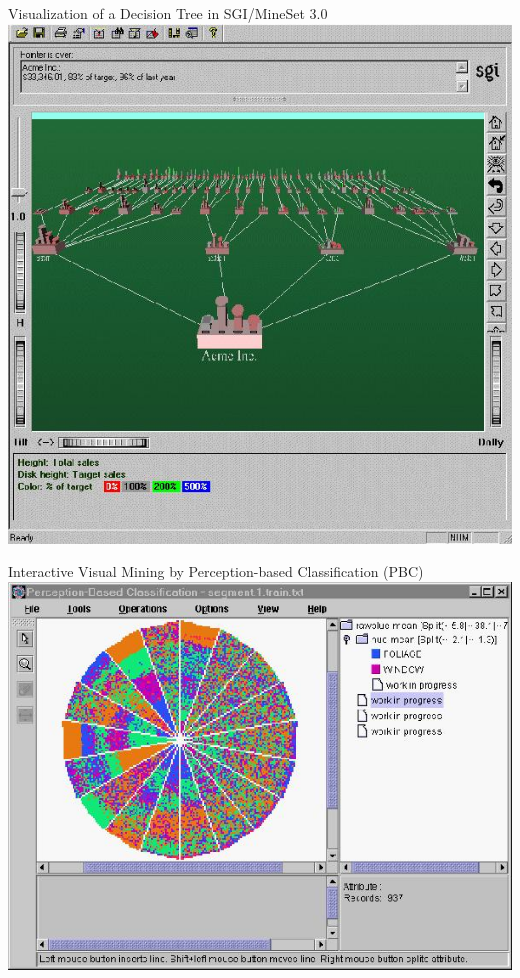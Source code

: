 \begin{frame}{Visualization of a Decision Tree in SGI/MineSet 3.0}
  \centering
  \includegraphics[height=0.9\textheight]{img/classification2.jpeg}
\end{frame}

\begin{frame}{Interactive Visual Mining by Perception-based Classification (PBC)}
  \centering
  \includegraphics[height=0.9\textheight]{img/classification3.jpeg}
\end{frame}
